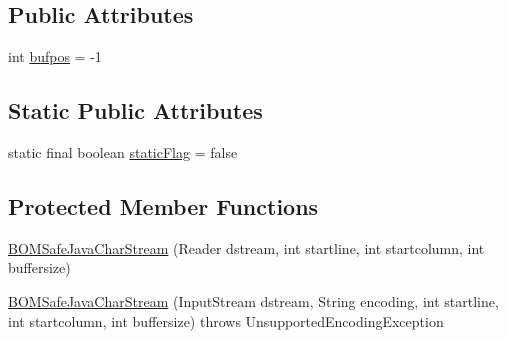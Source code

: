 \subsection*{Public Attributes}
\begin{DoxyCompactItemize}
\item 
int \hyperlink{classuk_1_1ac_1_1manchester_1_1cs_1_1_b_o_m_safe_java_char_stream_a955c28cbe16cf4dfeaa7a0c8757ec23f}{bufpos} = -\/1
\end{DoxyCompactItemize}
\subsection*{Static Public Attributes}
\begin{DoxyCompactItemize}
\item 
static final boolean \hyperlink{classuk_1_1ac_1_1manchester_1_1cs_1_1_b_o_m_safe_java_char_stream_ac64f8a94c23e58d990697ea98bba35b0}{static\-Flag} = false
\end{DoxyCompactItemize}
\subsection*{Protected Member Functions}
\begin{DoxyCompactItemize}
\item 
\hyperlink{classuk_1_1ac_1_1manchester_1_1cs_1_1_b_o_m_safe_java_char_stream_a47d39de6e2360aba82f4f9fdd3872d0f}{B\-O\-M\-Safe\-Java\-Char\-Stream} (Reader dstream, int startline, int startcolumn, int buffersize)
\item 
\hyperlink{classuk_1_1ac_1_1manchester_1_1cs_1_1_b_o_m_safe_java_char_stream_a21f9c8b3823427fbd34ee87e013da8f7}{B\-O\-M\-Safe\-Java\-Char\-Stream} (Input\-Stream dstream, String encoding, int startline, int startcolumn, int buffersize)  throws Unsupported\-Encoding\-Exception 
\end{DoxyCompactItemize}
